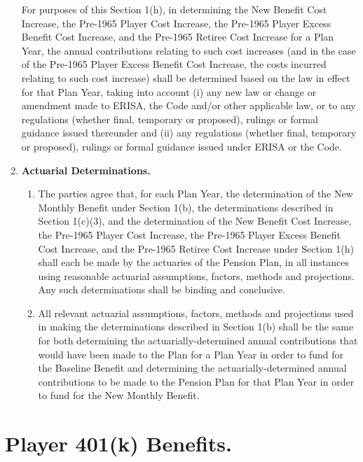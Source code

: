 \documentclass[
]{book}
\providecommand{\tightlist}{%
  \setlength{\itemsep}{0pt}\setlength{\parskip}{0pt}}
\begin{document}
\begin{enumerate}
  For purposes of this Section 1(h), in determining the New Benefit Cost Increase, the Pre-1965 Player Cost Increase, the Pre-1965 Player Excess Benefit Cost Increase, and the Pre-1965 Retiree Cost Increase for a Plan Year, the annual contributions relating to such cost increases (and in the case of the Pre-1965 Player Excess Benefit Cost Increase, the costs incurred relating to such cost increase) shall be determined based on the law in effect for that Plan Year, taking into account (i) any new law or change or amendment made to ERISA, the Code and/or other applicable law, or to any regulations (whether final, temporary or proposed), rulings or formal guidance issued thereunder and (ii) any regulations (whether final, temporary or proposed), rulings or formal guidance issued under ERISA or the Code.
\item
  \textbf{Actuarial Determinations.}

  \begin{enumerate}
  \def\labelenumii{(\arabic{enumii})}
  \tightlist
  \item
    The parties agree that, for each Plan Year, the determination of the New Monthly Benefit under Section 1(b), the determinations described in Section 1(c)(3), and the determination of the New Benefit Cost Increase, the Pre-1965 Player Cost Increase, the Pre-1965 Player Excess Benefit Cost Increase, and the Pre-1965 Retiree Cost Increase under Section 1(h) shall each be made by the actuaries of the Pension Plan, in all instances using reasonable actuarial assumptions, factors, methods and projections. Any such determinations shall be binding and conclusive.
  \item
    All relevant actuarial assumptions, factors, methods and projections used in making the determinations described in Section 1(b) shall be the same for both determining the actuarially-determined annual contributions that would have been made to the Plan for a Plan Year in order to fund for the Baseline Benefit and determining the actuarially-determined annual contributions to be made to the Pension Plan for that Plan Year in order to fund for the New Monthly Benefit.
  \end{enumerate}
\end{enumerate}

\hypertarget{player-401k-benefits.}{%
\section{Player 401(k) Benefits.}\label{player-401k-benefits.}}
\end{document}

